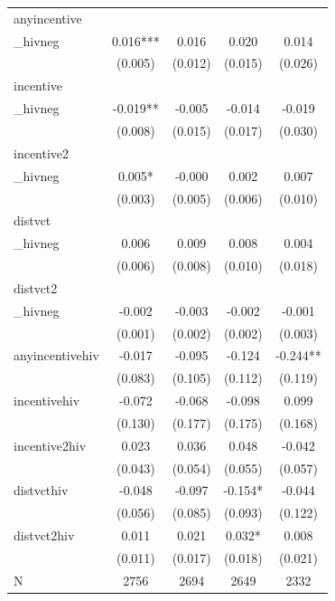 \begin{tabular}{lcccc}
\hline
anyincentive\\_hivneg & 0.016*** & 0.016 & 0.020 & 0.014 \\
 & (0.005) & (0.012) & (0.015) & (0.026) \\
incentive\\_hivneg & -0.019** & -0.005 & -0.014 & -0.019 \\
 & (0.008) & (0.015) & (0.017) & (0.030) \\
incentive2\\_hivneg & 0.005* & -0.000 & 0.002 & 0.007 \\
 & (0.003) & (0.005) & (0.006) & (0.010) \\
distvct\\_hivneg & 0.006 & 0.009 & 0.008 & 0.004 \\
 & (0.006) & (0.008) & (0.010) & (0.018) \\
distvct2\\_hivneg & -0.002 & -0.003 & -0.002 & -0.001 \\
 & (0.001) & (0.002) & (0.002) & (0.003) \\
anyincentivehiv & -0.017 & -0.095 & -0.124 & -0.244** \\
 & (0.083) & (0.105) & (0.112) & (0.119) \\
incentivehiv & -0.072 & -0.068 & -0.098 & 0.099 \\
 & (0.130) & (0.177) & (0.175) & (0.168) \\
incentive2hiv & 0.023 & 0.036 & 0.048 & -0.042 \\
 & (0.043) & (0.054) & (0.055) & (0.057) \\
distvcthiv & -0.048 & -0.097 & -0.154* & -0.044 \\
 & (0.056) & (0.085) & (0.093) & (0.122) \\
distvct2hiv & 0.011 & 0.021 & 0.032* & 0.008 \\
 & (0.011) & (0.017) & (0.018) & (0.021) \\
\hline
N & 2756 & 2694 & 2649 & 2332 \\
\hline
\end{tabular}
